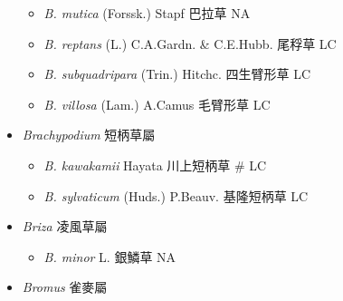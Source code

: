 \begin{itemize}
  \begin{itemize}
        \item[] \textit{B. mutica} (Forssk.) Stapf  巴拉草   NA
        \item[] \textit{B. reptans} (L.) C.A.Gardn. \& C.E.Hubb.  尾稃草   LC
        \item[] \textit{B. subquadripara} (Trin.) Hitchc.  四生臂形草   LC
        \item[] \textit{B. villosa} (Lam.) A.Camus  毛臂形草   LC
  \end{itemize}
 \item[] \textit{Brachypodium} 短柄草屬
                                
  \begin{itemize}
        \item[] \textit{B. kawakamii} Hayata  川上短柄草  \# LC
        \item[] \textit{B. sylvaticum} (Huds.) P.Beauv.  基隆短柄草   LC
  \end{itemize}
 \item[] \textit{Briza} 凌風草屬
                                
  \begin{itemize}
        \item[] \textit{B. minor} L.  銀鱗草   NA
  \end{itemize}
 \item[] \textit{Bromus} 雀麥屬
                                

\end{itemize}

